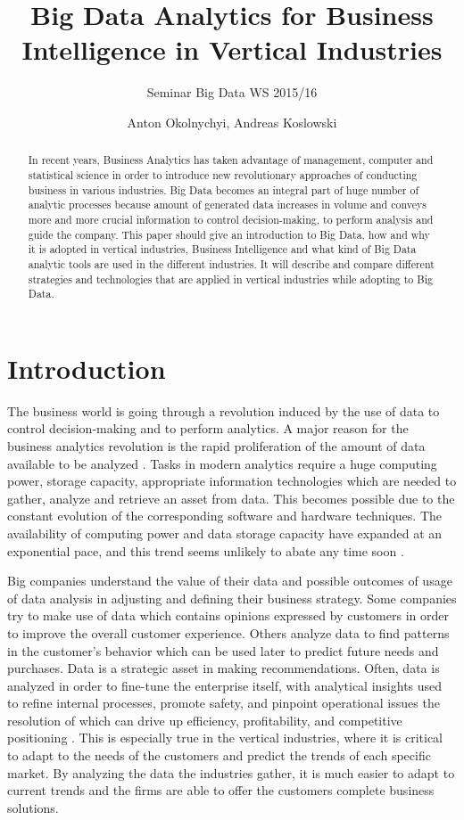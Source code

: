 \documentclass[runningheads]{llncs}
\title{Big Data Analytics for Business Intelligence in Vertical Industries}
\subtitle{Seminar Big Data WS 2015/16}
\author{Anton Okolnychyi, Andreas Koslowski}
\institute{RWTH Aachen University, 52056 Aachen, Germany\\
\{anton.okolnychyi, andreas.koslowski\}@rwth-aachen.de}
\begin{document}
\maketitle

\begin{abstract}
In recent years, Business Analytics has taken advantage of management, computer and statistical science in order to introduce new revolutionary approaches of conducting business in various industries. Big Data becomes an integral part of huge number of analytic processes because amount of generated data increases in volume and conveys more and more crucial information to control decision-making, to perform analysis and guide the company. 
This paper should give an introduction to Big Data, how and why it is adopted in vertical industries, Business Intelligence and what kind of Big Data analytic tools are used in the different industries. It will describe and compare different strategies and technologies that are applied in vertical industries while adopting to Big Data.
\end{abstract}

\section{Introduction}
The business world is going through a revolution induced by the use of data to control decision-making and to perform analytics. A major reason for the business analytics revolution is the rapid proliferation of the amount of data available to be analyzed \cite{Gopalkrishnan}. Tasks in modern analytics require a huge computing power, storage capacity, appropriate information technologies which are needed to gather, analyze and retrieve an asset from data. This becomes possible due to the constant evolution of the corresponding software and hardware techniques. The availability of computing power and data storage capacity have expanded at an exponential pace, and this trend seems unlikely to abate any time soon \cite{NYTIMES}.  

Big companies understand the value of their data and possible outcomes of usage of data analysis in adjusting and defining their business strategy.  Some companies try to make use of data which contains opinions expressed by customers in order to improve the overall customer experience. Others analyze data to find patterns in the customer's behavior which can be used later to predict future needs and purchases. Data is a strategic asset in making recommendations. Often, data is analyzed in order to fine-tune the enterprise itself, with analytical insights used to refine internal processes, promote safety, and pinpoint operational issues the resolution of which can drive up efficiency, profitability, and competitive positioning \cite{Guszcza}.
This is especially true in the vertical industries, where it is critical to adapt to the needs of the customers and predict the trends of each specific market. By analyzing the data the industries gather, it is much easier to adapt to current trends and the firms are able to offer the customers complete business solutions.
\end{document}
